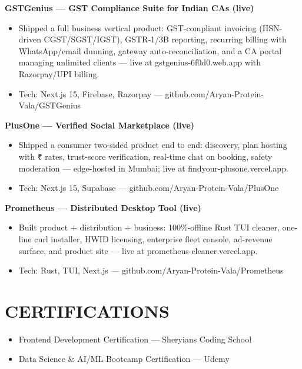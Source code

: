 \documentclass[9pt]{article}
\begin{document}
\textbf{GSTGenius  ---  GST Compliance Suite for Indian CAs (live)}
\vspace{1pt}
\begin{itemize}[leftmargin=11pt,itemsep=0pt,topsep=1pt,parsep=0pt]
\item Shipped a full business vertical product: GST-compliant invoicing (HSN-driven CGST/SGST/IGST), GSTR-1/3B reporting, recurring billing with WhatsApp/email dunning, gateway auto-reconciliation, and a CA portal managing unlimited clients  ---  live at gstgenius-6f0d0.web.app with Razorpay/UPI billing.
\item Tech: Next.js 15, Firebase, Razorpay  ---  github.com/Aryan-Protein-Vala/GSTGenius
\end{itemize}
\textbf{PlusOne  ---  Verified Social Marketplace (live)}
\vspace{1pt}
\begin{itemize}[leftmargin=11pt,itemsep=0pt,topsep=1pt,parsep=0pt]
\item Shipped a consumer two-sided product end to end: discovery, plan hosting with ₹ rates, trust-score verification, real-time chat on booking, safety moderation  ---  edge-hosted in Mumbai; live at findyour-plusone.vercel.app.
\item Tech: Next.js 15, Supabase  ---  github.com/Aryan-Protein-Vala/PlusOne
\end{itemize}
\textbf{Prometheus  ---  Distributed Desktop Tool (live)}
\vspace{1pt}
\begin{itemize}[leftmargin=11pt,itemsep=0pt,topsep=1pt,parsep=0pt]
\item Built product + distribution + business: 100\%-offline Rust TUI cleaner, one-line curl installer, HWID licensing, enterprise fleet console, ad-revenue surface, and product site  ---  live at prometheus-cleaner.vercel.app.
\item Tech: Rust, TUI, Next.js  ---  github.com/Aryan-Protein-Vala/Prometheus
\end{itemize}
\section*{CERTIFICATIONS}
\begin{itemize}[leftmargin=11pt,itemsep=0pt,topsep=1pt,parsep=0pt]
\item Frontend Development Certification  ---  Sheryians Coding School
\item Data Science \& AI/ML Bootcamp Certification  ---  Udemy
\end{itemize}
\end{document}
